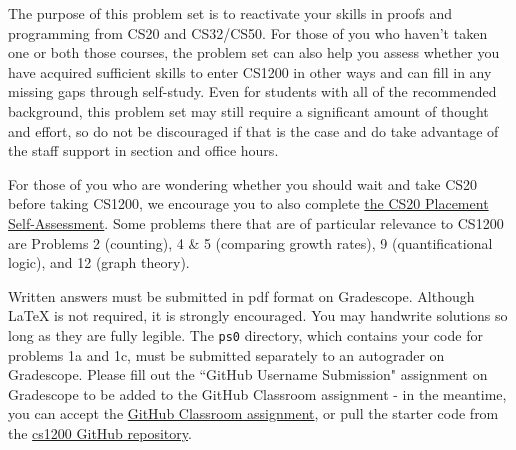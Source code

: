 \documentclass[11pt]{article}
\begin{document}

The purpose of this problem set is to reactivate your skills in proofs and programming from CS20 and CS32/CS50. For those of you who haven't taken one or both those courses, the problem set can also help you assess whether you have acquired sufficient skills to enter CS1200 in other ways and can fill in any missing gaps through self-study. Even for students with all of the recommended background, this problem set may still require a significant amount of thought and effort, so do not be discouraged if that is the case and do take advantage of the staff support in section and office hours. 

For those of you who are wondering whether you should wait and take CS20 before taking CS1200, we encourage you to also complete  \href{https://drive.google.com/file/d/1QIJR6sb9hfkK67PhpQaK9KQBzYwzXvsW/view}{the CS20 Placement Self-Assessment}.  Some problems there that are of particular relevance to CS1200 are Problems 2 (counting), 4 \& 5 (comparing growth rates), 9 (quantificational logic), and 12 (graph theory). 

Written answers must be submitted in pdf format on Gradescope. Although \LaTeX{} is not required, it is strongly encouraged. You may handwrite solutions so long as they are fully legible. The \texttt{ps0} directory, which contains your code for problems 1a and 1c, must be submitted separately to an autograder on Gradescope. Please fill out the ``GitHub Username Submission" assignment on Gradescope to be added to the GitHub Classroom assignment - in the meantime, you can accept the \href{https://classroom.github.com/a/BwZDNK_r}{GitHub Classroom assignment}, or pull the starter code from the \href{https://github.com/Harvard-CS-1200/cs1200}{cs1200 GitHub repository}.

 \newcommand{\children}{\mathit{children}}
 \newcommand{\parent}{\mathit{parent}}
 
\end{document}
